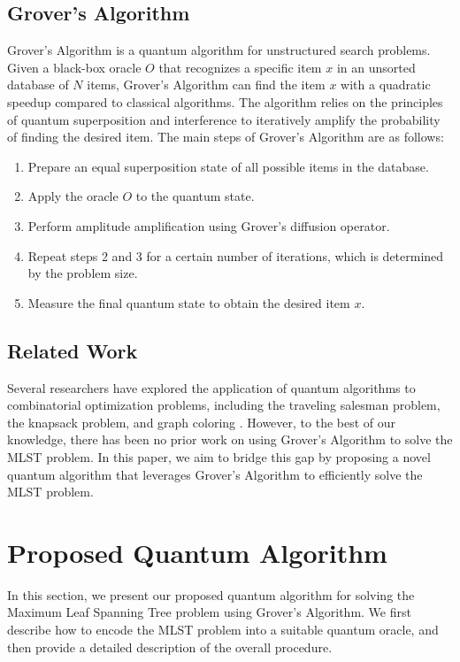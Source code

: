 \subsection{Grover's Algorithm}
Grover's Algorithm \cite{3} is a quantum algorithm for unstructured search problems. Given a black-box oracle $O$ that recognizes a specific item $x$ in an unsorted database of $N$ items, Grover's Algorithm can find the item $x$ with a quadratic speedup compared to classical algorithms. The algorithm relies on the principles of quantum superposition and interference to iteratively amplify the probability of finding the desired item. The main steps of Grover's Algorithm are as follows:

\begin{enumerate}
    \item Prepare an equal superposition state of all possible items in the database.
    
    \item Apply the oracle $O$ to the quantum state.
    
    \item Perform amplitude amplification using Grover's diffusion operator.
    
    \item Repeat steps 2 and 3 for a certain number of iterations, which is determined by the problem size.
    
    \item Measure the final quantum state to obtain the desired item $x$.
\end{enumerate}

\subsection{Related Work}
Several researchers have explored the application of quantum algorithms to combinatorial optimization problems, including the traveling salesman problem, the knapsack problem, and graph coloring \cite{7, 8, 9}. However, to the best of our knowledge, there has been no prior work on using Grover's Algorithm to solve the MLST problem. In this paper, we aim to bridge this gap by proposing a novel quantum algorithm that leverages Grover's Algorithm to efficiently solve the MLST problem.

\section{Proposed Quantum Algorithm} \label{sec:algorithm}
In this section, we present our proposed quantum algorithm for solving the Maximum Leaf Spanning Tree problem using Grover's Algorithm. We first describe how to encode the MLST problem into a suitable quantum oracle, and then provide a detailed description of the overall procedure.

